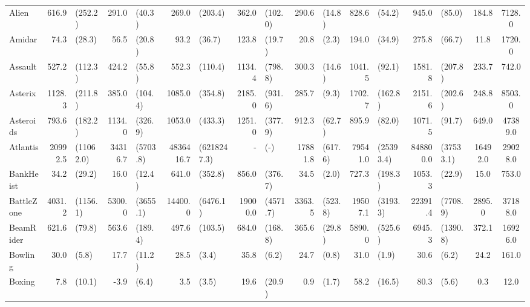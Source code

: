 \begin{landscape}
\begin{changemargin}{0cm}{0cm}
\begin{center}
\begin{table}[!htbp]
\begin{tabular}{lrlrlrlrlrlrlrlcc}
\midrule
Alien          &    616.9 &    (252.2) &    291.0 &    (40.3) &      269.0 &      (203.4) &    362.0 &    (102.0) &    290.6 &   (14.8) &    828.6 &     (54.2) &     945.0 &     (85.0) &    184.8 &   7128.0 \\
Amidar         &     74.3 &     (28.3) &     56.5 &    (20.8) &       93.2 &       (36.7) &    123.8 &     (19.7) &     20.8 &    (2.3) &    194.0 &     (34.9) &     275.8 &     (66.7) &     11.8 &   1720.0 \\
Assault        &    527.2 &    (112.3) &    424.2 &    (55.8) &      552.3 &      (110.4) &   1134.4 &    (798.8) &    300.3 &   (14.6) &   1041.5 &     (92.1) &    1581.8 &    (207.8) &    233.7 &    742.0 \\
Asterix        &   1128.3 &    (211.8) &    385.0 &   (104.4) &     1085.0 &      (354.8) &   2185.0 &    (931.6) &    285.7 &    (9.3) &   1702.7 &    (162.8) &    2151.6 &    (202.6) &    248.8 &   8503.0 \\
Asteroids      &    793.6 &    (182.2) &   1134.0 &   (326.9) &     1053.0 &      (433.3) &   1251.0 &    (377.9) &    912.3 &   (62.7) &    895.9 &     (82.0) &    1071.5 &     (91.7) &    649.0 &  47389.0 \\
Atlantis       &  20992.5 &  (11062.0) &  34316.7 &  (5703.8) &  4836416.7 &  (6218247.3) &      - &      (-) &  17881.8 &  (617.6) &  79541.0 &  (25393.4) &  848800.0 &  (37533.1) &  16492.0 &  29028.0 \\
BankHeist      &     34.2 &     (29.2) &     16.0 &    (12.4) &      641.0 &      (352.8) &    856.0 &    (376.7) &     34.5 &    (2.0) &    727.3 &    (198.3) &    1053.3 &     (22.9) &     15.0 &    753.0 \\
BattleZone     &   4031.2 &   (1156.1) &   5300.0 &  (3655.1) &    14400.0 &     (6476.1) &  19000.0 &   (4571.7) &   3363.5 &  (523.8) &  19507.1 &   (3193.3) &   22391.4 &   (7708.9) &   2895.0 &  37188.0 \\
BeamRider      &    621.6 &     (79.8) &    563.6 &   (189.4) &      497.6 &      (103.5) &    684.0 &    (168.8) &    365.6 &   (29.8) &   5890.0 &    (525.6) &    6945.3 &   (1390.8) &    372.1 &  16926.0 \\
Bowling        &     30.0 &      (5.8) &     17.7 &    (11.2) &       28.5 &        (3.4) &     35.8 &      (6.2) &     24.7 &    (0.8) &     31.0 &      (1.9) &      30.6 &      (6.2) &     24.2 &    161.0 \\
Boxing         &      7.8 &     (10.1) &     -3.9 &     (6.4) &        3.5 &        (3.5) &     19.6 &     (20.9) &      0.9 &    (1.7) &     58.2 &     (16.5) &      80.3 &      (5.6) &      0.3 &     12.0 \\

\end{tabular}
\end{table}
\end{center}
\end{changemargin}
\end{landscape}
